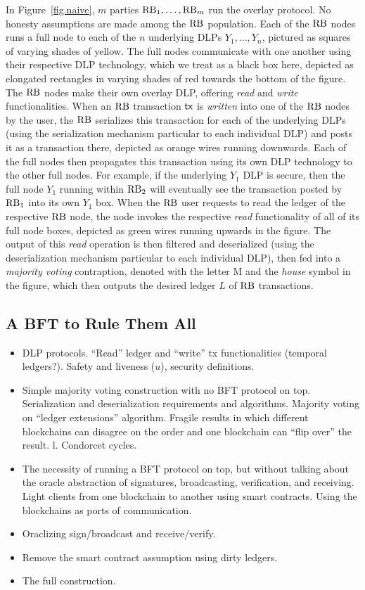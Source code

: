 In Figure~\ref{fig.naive}, $m$ parties $\mathrm{RB}_1, \ldots, \mathrm{RB}_m$ run the overlay protocol.
No honesty assumptions are made among the $\mathrm{RB}$ population. Each of the $\mathrm{RB}$ nodes runs
a full node to each of the $n$ underlying DLPs $Y_1, \ldots, Y_n$, pictured as squares
of varying shades of yellow. The full nodes communicate with one another using their
respective DLP technology, which we treat as a black box here, depicted as elongated
rectangles in varying shades of red towards the bottom of the figure. The $\mathrm{RB}$ nodes
make their own overlay DLP, offering \emph{read} and \emph{write} functionalities.
When an $\mathrm{RB}$ transaction $\textsf{tx}$ is \emph{written} into one of the $\mathrm{RB}$ nodes by the user,
the $\mathrm{RB}$ serializes this transaction for each of the underlying DLPs (using the
serialization mechanism particular to each individual DLP) and posts it
as a transaction there, depicted as orange wires running downwards. Each of the
full nodes then propagates this transaction using its own DLP technology to the
other full nodes. For example, if the underlying $Y_1$ DLP is secure, then
the full node $Y_1$ running within $\mathrm{RB}_2$ will eventually see the transaction
posted by $\mathrm{RB}_1$ into its own $Y_1$ box. When the $\mathrm{RB}$ user requests to read the
ledger of the respective $\mathrm{RB}$ node, the node invokes the respective \emph{read}
functionality of all of its full node boxes, depicted as green wires running upwards
in the figure. The output of this \emph{read} operation is then filtered and deserialized
(using the deserialization mechanism particular to each individual DLP), then fed into a
\emph{majority voting} contraption, denoted with the letter M and the \emph{house} symbol
in the figure, which then outputs the desired ledger $L$ of $\mathrm{RB}$ transactions.

\subsection{A BFT to Rule Them All}\label{sec:construction-bft}

\begin{itemize}
  \item DLP protocols. ``Read'' ledger and ``write'' tx functionalities (temporal ledgers?). Safety and liveness ($u$), security definitions.
  \item Simple majority voting construction with no BFT protocol on top. Serialization and deserialization requirements and algorithms. Majority voting on ``ledger extensions'' algorithm. Fragile results in which different blockchains can disagree on the order and one blockchain can ``flip over'' the result. l. Condorcet cycles.
  \item The necessity of running a BFT protocol on top, but without talking about the oracle abstraction of signatures, broadcasting, verification, and receiving. Light clients from one blockchain to another using smart contracts. Using the blockchains as ports of communication.
  \item Oraclizing sign/broadcast and receive/verify.
  \item Remove the smart contract assumption using dirty ledgers.
  \item The full construction.
\end{itemize}

